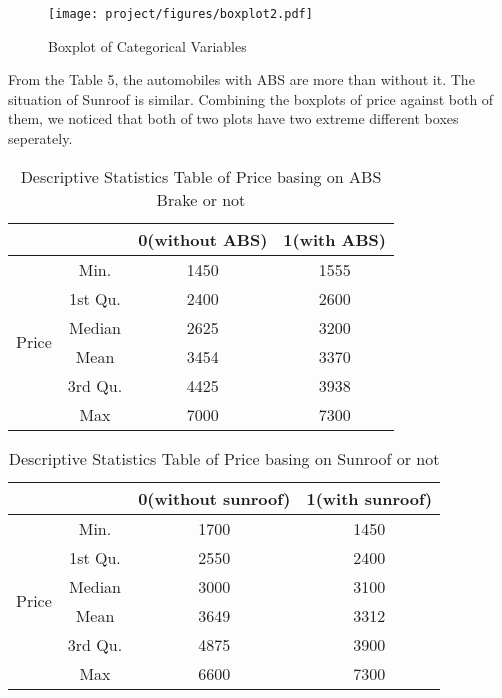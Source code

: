 \documentclass[a4paper]{article}
\begin{document}
\begin{figure}[!htb]
    \centering
    \texttt{[image: project/figures/boxplot2.pdf]}
    \caption{Boxplot of Categorical Variables}
    \label{2}
\end{figure}

\noindent
From the Table 5, the automobiles with ABS are more than without it. The situation of Sunroof is similar. Combining the boxplots of price against both of them, we noticed that both of two plots have two extreme different boxes seperately. 
\begin{table}[!htb]
\centering
\begin{tabular}{c|c|cc}
\toprule
                       &         & 0(without ABS) & 1(with ABS) \\
\midrule
\multirow{6}{*}{Price} & Min.    & 1450           & 1555        \\
                       & 1st Qu. & 2400           & 2600        \\
                       & Median  & 2625           & 3200        \\
                       & Mean    & 3454           & 3370        \\
                       & 3rd Qu. & 4425           & 3938        \\
                       & Max     & 7000           & 7300        \\
\bottomrule
\end{tabular}
    \caption{Descriptive Statistics Table of Price basing on ABS Brake or not}
    \label{tab:my_label}
\end{table}

\begin{table}[!htb]
\centering
\begin{tabular}{c|c|cc}
\toprule
                       &         & 0(without sunroof) & 1(with sunroof) \\
\midrule
\multirow{6}{*}{Price} & Min.    & 1700          & 1450        \\
                       & 1st Qu. & 2550          & 2400        \\
                       & Median  & 3000           & 3100        \\
                       & Mean    & 3649          & 3312        \\
                       & 3rd Qu. & 4875          & 3900        \\
                       & Max     & 6600           & 7300        \\
\bottomrule
\end{tabular}
    \caption{Descriptive Statistics Table of Price basing on Sunroof or not}
    \label{tab:my_label}
\end{table}
\end{document}
